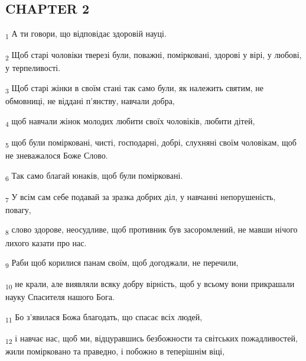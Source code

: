 \subsection{CHAPTER 2}
\begin{tcolorbox}
\textsubscript{1} А ти говори, що відповідає здоровій науці.
\end{tcolorbox}
\begin{tcolorbox}
\textsubscript{2} Щоб старі чоловіки тверезі були, поважні, помірковані, здорові у вірі, у любові, у терпеливості.
\end{tcolorbox}
\begin{tcolorbox}
\textsubscript{3} Щоб старі жінки в своїм стані так само були, як належить святим, не обмовниці, не віддані п'янству, навчали добра,
\end{tcolorbox}
\begin{tcolorbox}
\textsubscript{4} щоб навчали жінок молодих любити своїх чоловіків, любити дітей,
\end{tcolorbox}
\begin{tcolorbox}
\textsubscript{5} щоб були помірковані, чисті, господарні, добрі, слухняні своїм чоловікам, щоб не зневажалося Боже Слово.
\end{tcolorbox}
\begin{tcolorbox}
\textsubscript{6} Так само благай юнаків, щоб були помірковані.
\end{tcolorbox}
\begin{tcolorbox}
\textsubscript{7} У всім сам себе подавай за зразка добрих діл, у навчанні непорушеність, повагу,
\end{tcolorbox}
\begin{tcolorbox}
\textsubscript{8} слово здорове, неосудливе, щоб противник був засоромлений, не мавши нічого лихого казати про нас.
\end{tcolorbox}
\begin{tcolorbox}
\textsubscript{9} Раби щоб корилися панам своїм, щоб догоджали, не перечили,
\end{tcolorbox}
\begin{tcolorbox}
\textsubscript{10} не крали, але виявляли всяку добру вірність, щоб у всьому вони прикрашали науку Спасителя нашого Бога.
\end{tcolorbox}
\begin{tcolorbox}
\textsubscript{11} Бо з'явилася Божа благодать, що спасає всіх людей,
\end{tcolorbox}
\begin{tcolorbox}
\textsubscript{12} і навчає нас, щоб ми, відцуравшись безбожности та світських пожадливостей, жили помірковано та праведно, і побожно в теперішнім віці,
\end{tcolorbox}

